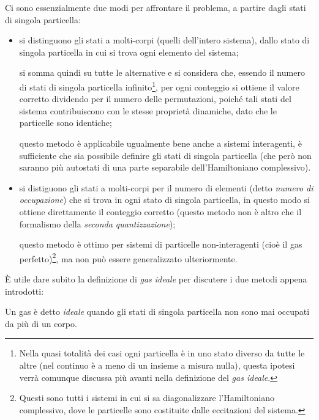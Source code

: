 Ci sono essenzialmente due modi per affrontare il problema, a partire dagli stati di singola particella:
\begin{itemize}
	\item si distinguono gli stati a molti-corpi (quelli dell'intero sistema), dallo stato di singola particella in cui si trova ogni elemento del sistema;
	
	si somma quindi su tutte le alternative e si considera che, essendo il numero di stati di singola particella infinito\footnote{Nella quasi totalità dei casi ogni particella è in uno stato diverso da tutte le altre (nel continuo è a meno di un insieme a misura nulla), questa ipotesi verrà comunque discussa più avanti nella definizione del \textit{gas ideale}.}, per ogni conteggio si ottiene il valore corretto dividendo per il numero delle permutazioni, poiché tali stati del sistema contribuiscono con le stesse proprietà dinamiche, dato che le particelle sono identiche;
	
	questo metodo è applicabile ugualmente bene anche a sistemi interagenti, è sufficiente che sia possibile definire gli stati di singola particella (che però non saranno più autostati di una parte separabile dell'Hamiltoniano complessivo).
	
	\item si distiguono gli stati a molti-corpi per il numero di elementi (detto \textit{numero di occupazione}) che si trova in ogni stato di singola particella, in questo modo si ottiene direttamente il conteggio corretto (questo metodo non è altro che il formalismo della \textit{seconda quantizzazione});
	
	questo metodo è ottimo per sistemi di particelle non-interagenti (cioè il gas perfetto)\footnote{Questi sono tutti i sistemi in cui si sa diagonalizzare l'Hamiltoniano complessivo, dove le particelle sono costituite dalle eccitazioni del sistema.}, ma non può essere generalizzato ulteriormente.
\end{itemize}

\noindent \`E utile dare subito la definizione di \textit{gas ideale} per discutere i due metodi appena introdotti:

\begin{defn}
	\label{def:idgas}
	Un gas è detto \textit{ideale} quando gli stati di singola particella non sono mai occupati da più di un corpo.
\end{defn}

